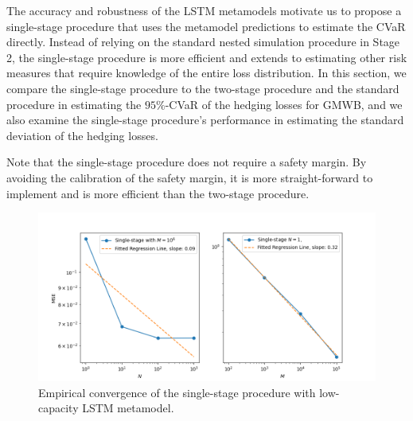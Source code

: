 \documentclass{article}
\begin{document}
The accuracy and robustness of the LSTM metamodels motivate us to propose a single-stage procedure that uses the metamodel predictions to estimate the CVaR directly.
Instead of relying on the standard nested simulation procedure in Stage 2, the single-stage procedure is more efficient and extends to estimating other risk measures that require knowledge of the entire loss distribution.
In this section, we compare the single-stage procedure to the two-stage procedure and the standard procedure in estimating the $95\%$-CVaR of the hedging losses for GMWB, and we also examine the single-stage procedure's performance in estimating the standard deviation of the hedging losses. 


Note that the single-stage procedure does not require a safety margin.
By avoiding the calibration of the safety margin, it is more straight-forward to implement and is more efficient than the two-stage procedure.


\begin{figure}[ht!]
    \centering
    \includegraphics[width=\textwidth]{./figures/singleStage/lstmConvergence.png}
    \caption{Empirical convergence of the single-stage procedure with low-capacity LSTM metamodel.} 
    \label{fig:mnConvergence}
\end{figure}
\end{document}

